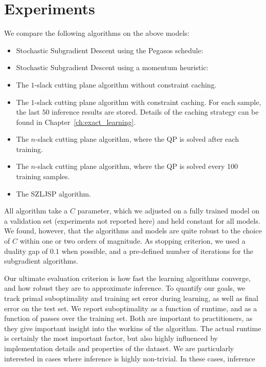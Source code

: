 \section{Experiments}
We compare the following algorithms on the above models:
\begin{itemize}
    \item Stochastic Subgradient Descent using the Pegasos schedule: %
    \item Stochastic Subgradient Descent using a momentum heuristic:
    \item The $1$-slack cutting plane algorithm without constraint caching.
    \item The $1$-slack cutting plane algorithm with constraint caching. For
            each sample, the last $50$ inference results are stored.
            Details of the caching strategy can be found in Chapter~\ref{ch:exact_learning}.
    \item The $n$-slack cutting plane algorithm, where the QP is solved after each training.
    \item The $n$-slack cutting plane algorithm, where the QP is solved every 100 training samples.
    \item The SZLJSP algorithm.
\end{itemize}
All algorithm take a $C$ parameter, which we adjusted on a fully trained model
on a validation set (experiments not reported here) and held constant for all models.
We found, however, that the algorithms and models are quite robust to the choice of $C$ within
one or two orders of magnitude.
As stopping criterion, we used a duality gap of $0.1$ when possible, and a pre-defined
number of iterations for the subgradient algorithms.

Our ultimate evaluation criterion is how fast the learning algorithms converge,
and how robust they are to approximate inference.  To quantify our goals, we
track primal suboptimality and training set error during learning, as well as
final error on the test set.
We report suboptimality as a function of runtime, and as a function of passes over the training set.
Both are important to practitioners, as they give important insight into the workins of the algorithm.
The actual runtime is certainly the most important factor, but also highly influenced by implementation details
and properties of the dataset. We are particularly interested in cases where inference is highly non-trivial.
In these cases, inference 

